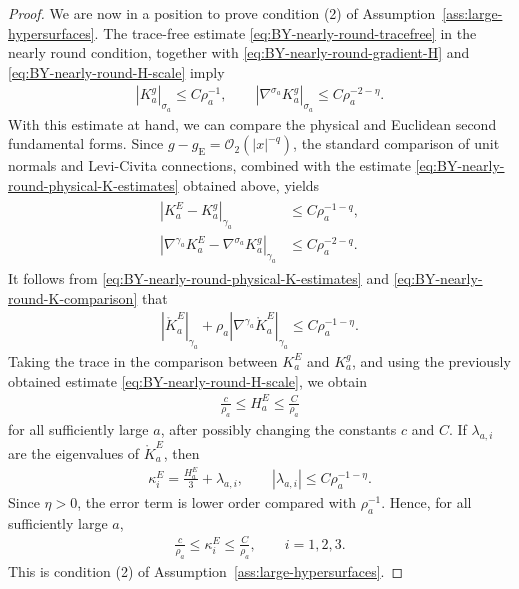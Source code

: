 \documentclass[10pt]{amsart}
\newcommand{\gE}{g_{\mathrm{E}}}
\theoremstyle{plain}
\theoremstyle{remark}
\begin{document}
\begin{proof}
		We are now in a position to prove condition \textup{(2)} of Assumption~\ref{ass:large-hypersurfaces}. The trace-free estimate \eqref{eq:BY-nearly-round-tracefree} in the nearly round condition, together with \eqref{eq:BY-nearly-round-gradient-H} and
		\eqref{eq:BY-nearly-round-H-scale} imply
		\begin{align}\label{eq:BY-nearly-round-physical-K-estimates}
			|K_a^g|_{\sigma_a}
			\leq
			C\rho_a^{-1},
			\qquad
			\left|
			\nabla^{\sigma_a}K_a^g
			\right|_{\sigma_a}
			\leq
			C\rho_a^{-2-\eta}.
		\end{align}
		With this estimate at hand, we can compare the physical and Euclidean second fundamental forms. Since $g - \gE = \mathcal{O}_2(|x|^{-q})$, the standard comparison of unit normals and Levi-Civita connections, combined with the estimate \eqref{eq:BY-nearly-round-physical-K-estimates} obtained above, yields
		\begin{align}\label{eq:BY-nearly-round-K-comparison}
			\begin{split}
				\left|
				K_a^E-K_a^g
				\right|_{\gamma_a}
				&\leq
				C\rho_a^{-1-q},
				\\
				\left|
				\nabla^{\gamma_a}K_a^E
				-
				\nabla^{\sigma_a}K_a^g
				\right|_{\gamma_a}
				&\leq
				C\rho_a^{-2-q}.
			\end{split}
		\end{align}
		It follows from
		\eqref{eq:BY-nearly-round-physical-K-estimates} and
		\eqref{eq:BY-nearly-round-K-comparison} that
		\begin{align}
			\left|
			\mathring K_a^E
			\right|_{\gamma_a}
			+
			\rho_a
			\left|
			\nabla^{\gamma_a}\mathring K_a^E
			\right|_{\gamma_a}
			\leq
			C\rho_a^{-1-\eta}.
		\end{align}
		Taking the trace in the comparison between $K_a^E$ and $K_a^g$, and using the previously obtained estimate \eqref{eq:BY-nearly-round-H-scale}, we obtain
		\begin{align}\label{eq:mean-curvature-bound}
			\frac{c}{\rho_a}
			\leq
			H_a^E
			\leq
			\frac{C}{\rho_a}
		\end{align}
		for all sufficiently large $a$, after possibly changing the constants $c$ and $C$. If $\lambda_{a,i}$ are the eigenvalues of
		$\mathring K_a^E$, then
		\begin{align*}
			\kappa_i^E
			=
			\frac{H_a^E}{3}
			+
			\lambda_{a,i},
			\qquad
			|\lambda_{a,i}|
			\leq
			C\rho_a^{-1-\eta}.
		\end{align*}
		Since $\eta>0$, the error term is lower order compared with
		$\rho_a^{-1}$. Hence, for all sufficiently large $a$,
		\begin{align*}
			\frac{c}{\rho_a}
			\leq
			\kappa_i^E
			\leq
			\frac{C}{\rho_a},
			\qquad
			i=1,2,3.
		\end{align*}
		This is condition \textup{(2)} of
		Assumption~\ref{ass:large-hypersurfaces}.
	\end{proof}
	
\end{document}
